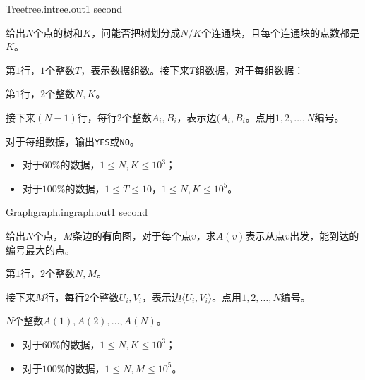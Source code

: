 \documentclass[11pt,a4paper,oneside]{article}
\begin{document}
\begin{problem}{Tree}{tree.in}{tree.out}{1 second} 

    给出$N$个点的树和$K$，问能否把树划分成$N / K$个连通块，且每个连通块的点数都是$K$。

    \InputFile

    第$1$行，$1$个整数$T$，表示数据组数。接下来$T$组数据，对于每组数据：

    第$1$行，$2$个整数$N, K$。

    接下来$(N - 1)$行，每行$2$个整数$A_i, B_i$，表示边$(A_i, B_i$。点用$1, 2, \dots, N$编号。

    \OutputFile

    对于每组数据，输出\texttt{YES}或\texttt{NO}。

    \Example

    \begin{example}
    \end{example}

    \Note
    
    \begin{itemize}
        \item 对于$60\%$的数据，$1 \leq N, K \leq 10^3$；

        \item 对于$100\%$的数据，$1 \leq T \leq 10$，$1 \leq N, K \leq 10^5$。
    \end{itemize}

\end{problem}

\begin{problem}{Graph}{graph.in}{graph.out}{1 second} 
    
    给出$N$个点，$M$条边的\textbf{有向}图，对于每个点$v$，求$A(v)$表示从点$v$出发，能到达的编号最大的点。

    \InputFile

    第$1$行，$2$个整数$N, M$。

    接下来$M$行，每行$2$个整数$U_i, V_i$，表示边$\langle U_i, V_i \rangle$。点用$1, 2, \dots, N$编号。

    \OutputFile

    $N$个整数$A(1), A(2), \dots, A(N)$。

    \Example

    \begin{example}
    \end{example}

    \Note
    
    \begin{itemize}
        \item 对于$60\%$的数据，$1 \leq N, K \leq 10^3$；

        \item 对于$100\%$的数据，$1 \leq N, M \leq 10^5$。
    \end{itemize}

\end{problem}
\end{document}
